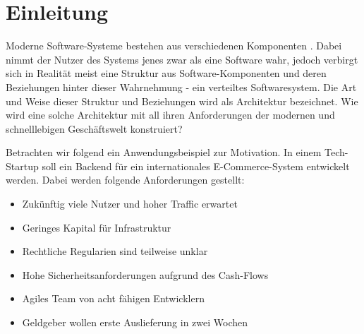 \documentclass[acmtog]{acmart}
\begin{document}
\maketitle

\section{Einleitung}
Moderne Software-Systeme bestehen aus verschiedenen Komponenten \cite{evolutionOfDistributedSystems}.
Dabei nimmt der Nutzer des Systems jenes zwar als eine Software wahr, jedoch verbirgt sich in Realität meist eine Struktur aus
Software-Komponenten und deren Beziehungen hinter dieser Wahrnehmung - ein verteiltes Softwaresystem.
Die Art und Weise dieser Struktur und Beziehungen wird als Architektur bezeichnet.
Wie wird eine solche Architektur mit all ihren Anforderungen der modernen und schnelllebigen Geschäftswelt konstruiert?

Betrachten wir folgend ein Anwendungsbeispiel zur Motivation.
In einem Tech-Startup soll ein Backend für ein internationales E-Commerce-System entwickelt werden.
Dabei werden folgende Anforderungen gestellt:
\begin{itemize}
  \item Zukünftig viele Nutzer und hoher Traffic erwartet
  \item Geringes Kapital für Infrastruktur
  \item Rechtliche Regularien sind teilweise unklar
  \item Hohe Sicherheitsanforderungen aufgrund des Cash-Flows
  \item Agiles Team von acht fähigen Entwicklern
  \item Geldgeber wollen erste Auslieferung in zwei Wochen
\end{itemize}
\end{document}
